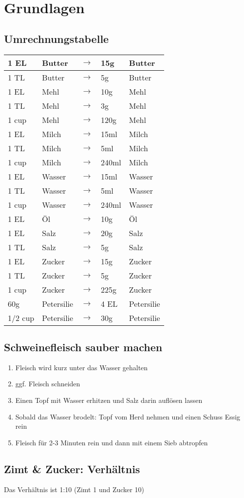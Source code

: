 \newpage
\section{Grundlagen}
\subsection{Umrechnungstabelle}
\begin{tabular}{l | l | l | l | l}
1 EL & Butter & $\rightarrow$ & 15g & Butter \\
\hline
1 TL & Butter & $\rightarrow$ & 5g & Butter \\
\hline
1 EL & Mehl & $\rightarrow$ & 10g & Mehl \\
\hline
1 TL & Mehl & $\rightarrow$ & 3g & Mehl \\
\hline
1 cup & Mehl & $\rightarrow$ & 120g & Mehl \\
\hline
1 EL & Milch &  $\rightarrow$ & 15ml & Milch \\
\hline
1 TL & Milch & $\rightarrow$ & 5ml & Milch \\
\hline
1 cup & Milch & $\rightarrow$ & 240ml & Milch \\
\hline
1 EL & Wasser &  $\rightarrow$ & 15ml & Wasser \\
\hline
1 TL & Wasser & $\rightarrow$ & 5ml & Wasser \\
\hline 
1 cup & Wasser & $\rightarrow$ & 240ml & Wasser \\
\hline 
1 EL & Öl & $\rightarrow$ & 10g & Öl \\
\hline
1 EL & Salz & $\rightarrow$ & 20g & Salz \\
\hline
1 TL & Salz & $\rightarrow$ & 5g & Salz \\
\hline
1 EL & Zucker & $\rightarrow$ & 15g & Zucker \\
\hline
1 TL & Zucker & $\rightarrow$ & 5g & Zucker \\
\hline
1 cup & Zucker & $\rightarrow$ & 225g & Zucker \\
\hline
60g & Petersilie & $\rightarrow$ & 4 EL & Petersilie \\
\hline 
1/2 cup & Petersilie & $\rightarrow$ & 30g & Petersilie \\
\end{tabular}

\subsection{Schweinefleisch sauber machen}
\begin{enumerate}[noitemsep]
	\item Fleisch wird kurz unter das Wasser gehalten
	\item ggf. Fleisch schneiden
	\item Einen Topf mit Wasser erhitzen und Salz darin auflösen lassen
	\item Sobald das Wasser brodelt: Topf vom Herd nehmen und einen Schuss Essig rein
	\item Fleisch für 2-3 Minuten rein und dann mit einem Sieb abtropfen
\end{enumerate}

\subsection{Zimt \& Zucker: Verhältnis}
Das Verhältnis ist 1:10 (Zimt 1 und Zucker 10)